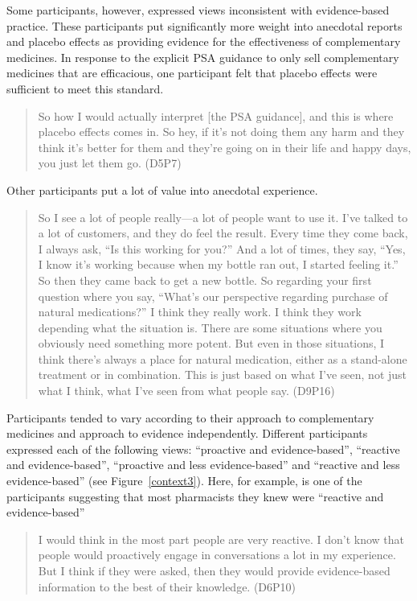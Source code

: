 \documentclass[11pt,a4paper]{article}
\begin{document}
Some participants, however, expressed views inconsistent with
evidence-based practice. These participants put significantly more
weight into anecdotal reports and placebo effects as providing evidence
for the effectiveness of complementary medicines. In response to the
explicit PSA guidance to only sell complementary medicines that are
efficacious, one participant felt that placebo effects were sufficient
to meet this standard.

\begin{quote}
So how I would actually interpret {[}the PSA guidance{]}, and this is
where placebo effects comes in. So hey, if it's not doing them any harm
and they think it's better for them and they're going on in their life
and happy days, you just let them go. (D5P7)
\end{quote}

Other participants put a lot of value into anecdotal experience.

\begin{quote}
So I see a lot of people really---a lot of people want to use it. I've
talked to a lot of customers, and they do feel the result. Every time
they come back, I always ask, ``Is this working for you?'' And a lot of
times, they say, ``Yes, I know it's working because when my bottle ran
out, I started feeling it.'' So then they came back to get a new bottle.
So regarding your first question where you say, ``What's our perspective
regarding purchase of natural medications?'' I think they really work. I
think they work depending what the situation is. There are some
situations where you obviously need something more potent. But even in
those situations, I think there's always a place for natural medication,
either as a stand-alone treatment or in combination. This is just based
on what I've seen, not just what I think, what I've seen from what
people say. (D9P16)
\end{quote}

Participants tended to vary according to their approach to complementary
medicines and approach to evidence independently. Different participants
expressed each of the following views: ``proactive and evidence-based'',
``reactive and evidence-based'', ``proactive and less evidence-based''
and ``reactive and less evidence-based'' (see Figure~\ref{context3}).
Here, for example, is one of the participants suggesting that most
pharmacists they knew were ``reactive and evidence-based''

\begin{quote}
I would think in the most part people are very reactive. I don't know
that people would proactively engage in conversations a lot in my
experience. But I think if they were asked, then they would provide
evidence-based information to the best of their knowledge. (D6P10)
\end{quote}
\end{document}
